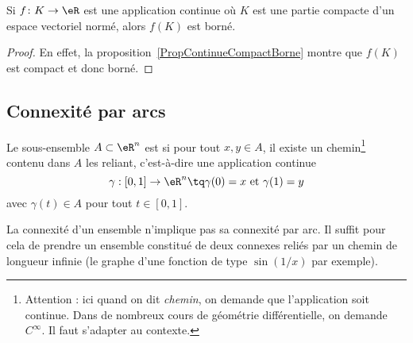 \begin{corollary}	\label{CorFnContinueCompactBorne}
	Si $f\colon K\to \eR$ est une application continue où $K$ est une partie compacte d'un espace vectoriel normé, alors \( f(K)\) est borné.
\end{corollary}

\begin{proof}
	En effet, la proposition~\ref{PropContinueCompactBorne} montre que $f(K)$ est compact et donc borné.
\end{proof}



\subsection{Connexité par arcs}

\begin{definition}
  Le sous-ensemble $A \subset \eR^n$ est  si pour tout $x, y \in A$, il existe un chemin\footnote{Attention : ici quand on dit \emph{chemin}, on demande que l'application soit continue. Dans de nombreux cours de géométrie différentielle, on demande $ C^{\infty}$. Il faut s'adapter au contexte.} contenu dans $A$ les reliant, c'est-à-dire une application continue
  \begin{equation*}
    \gamma : [0,1] \to \eR^n \tq \gamma(0) = x~\text{et}~\gamma(1) = y
  \end{equation*}
  avec $\gamma(t) \in A$ pour tout $t\in [0,1]$.
\end{definition}

La connexité d'un ensemble n'implique pas sa connexité par arc. Il suffit pour cela de prendre un ensemble constitué de deux connexes reliés par un chemin de longueur infinie (le graphe d'une fonction de type \( \sin(1/x)\) par exemple).

